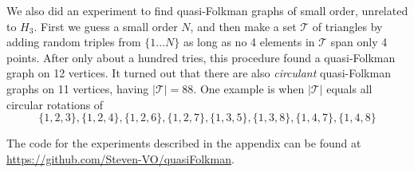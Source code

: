 \documentclass[A4paper,reqno,oneside,12pt]{amsart}
\theoremstyle{plain}
\theoremstyle{definition}
\newcommand{\scT}{\mathscr{T}}
\begin{document}
We also did an experiment to find quasi-Folkman graphs of small order, unrelated to $H_3$.
First we guess a small order $N$, and then make a set $\scT$ of triangles by adding random triples from $\{1\dots N \}$ as long as no 4 elements in $\scT$ span only 4 points.
After only about a hundred tries, this procedure found a quasi-Folkman graph on 12 vertices.
It turned out that there are also \textit{circulant} quasi-Folkman graphs on 11 vertices, having $|\scT| = 88$.
One example is when $|\scT|$ equals all circular rotations of $$\{1,2,3\},\{1,2,4\},\{1,2,6\},\{1,2,7\},\{1,3,5\},\{1,3,8\},\{1,4,7\},\{1,4,8\}$$

The code for the experiments described in the appendix can be found at \url{https://github.com/Steven-VO/quasiFolkman}.
\end{document}
